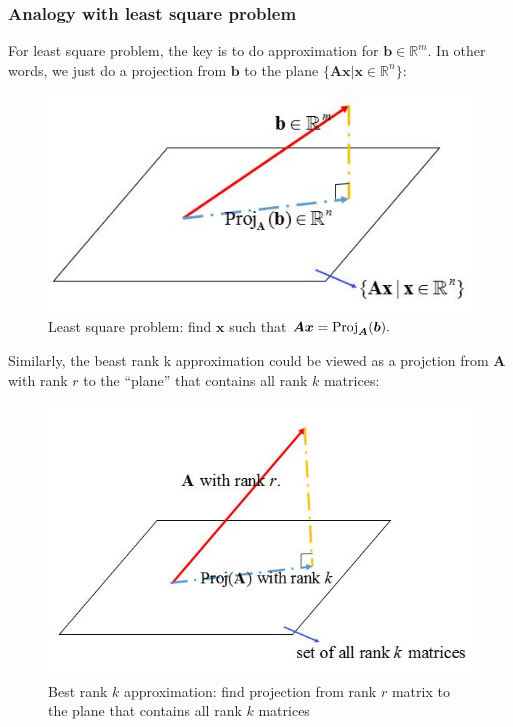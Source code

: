 \subsubsection{Analogy with least square problem}
For least square problem, the key is to do approximation for $\bm b\in\mathbb{R}^m$. In other words, we just do a projection from $\bm b$ to the plane $\{\bm{Ax}|\bm x\in\mathbb{R}^n\}$:
\begin{figure}[H]
\centering\includegraphics{week7/least_square}
\caption{Least square problem: find $\bm x$ such that $\bm{Ax}=\operatorname{Proj}_{\bm A}(\bm b).$}
\end{figure}
Similarly, the beast rank k approximation could be viewed as a projction from $\bm A$ with rank $r$ to the ``plane'' that contains all rank $k$ matrices:
\begin{figure}[H]
\centering\includegraphics{week7/rank_r}
\caption{Best rank $k$ approximation: find projection from rank $r$ matrix to the plane that contains all rank $k$ matrices}
\end{figure}